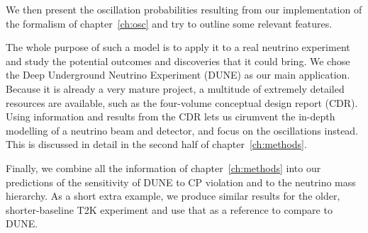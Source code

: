 We then present the oscillation probabilities resulting from our
implementation of the formalism of chapter~\ref{ch:osc} and try to outline some
relevant features. 

The whole purpose of such a model is to apply it to a real neutrino experiment
and study the potential outcomes and discoveries that it could bring.
We chose the Deep Underground Neutrino Experiment (DUNE) as our main
application. Because it is already a very mature project, a multitude of
extremely detailed resources are available, such as the four-volume conceptual
design report\cite{cdr-all} (CDR). Using information and results from the CDR
lets us cirumvent the in-depth modelling of a neutrino beam and detector, and
focus on the oscillations instead. This is discussed in detail in the second
half of chapter~\ref{ch:methods}.

Finally, we combine all the information of chapter~\ref{ch:methods} into our
predictions of the sensitivity of DUNE to CP violation and to the neutrino mass
hierarchy.
As a short extra example, we produce similar results for the older, shorter-baseline
T2K experiment and use that as a reference to compare to DUNE.


